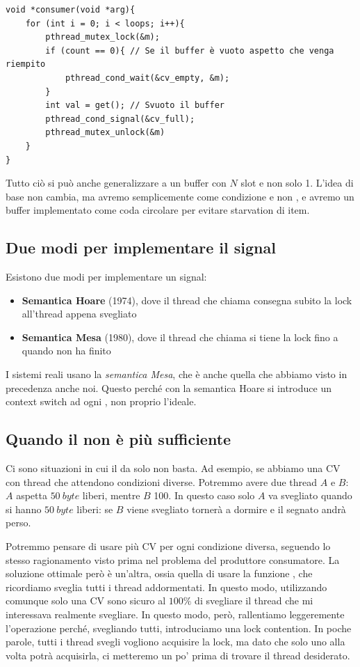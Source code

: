 \documentclass[11pt, a4paper, titlepage, oneside]{scrbook}
\begin{document}
\begin{lstlisting}[style=C]
void *consumer(void *arg){
    for (int i = 0; i < loops; i++){
        pthread_mutex_lock(&m);
        if (count == 0){ // Se il buffer è vuoto aspetto che venga riempito
            pthread_cond_wait(&cv_empty, &m);
        }
        int val = get(); // Svuoto il buffer
        pthread_cond_signal(&cv_full);
        pthread_mutex_unlock(&m)
    }
}
\end{lstlisting}

Tutto ciò si può anche generalizzare a un buffer con $N$ slot e non solo 1. L'idea di base non cambia, ma avremo semplicemente come condizione  e non , e avremo un buffer implementato come coda circolare per evitare starvation di item.

\subsection{Due modi per implementare il signal}

Esistono due modi per implementare un signal:
\begin{itemize}
    \item \textbf{Semantica Hoare} (1974), dove il thread che chiama  consegna subito la lock all'thread appena svegliato
    \item \textbf{Semantica Mesa} (1980), dove il thread che chiama  si tiene la lock fino a quando non ha finito
\end{itemize}

I sistemi reali usano la \textit{semantica Mesa}, che è anche quella che abbiamo visto in precedenza anche noi. Questo perché con la semantica Hoare si introduce un context switch ad ogni , non proprio l'ideale. 

\subsection{Quando il  non è più sufficiente}

Ci sono situazioni in cui il  da solo non basta. Ad esempio, se abbiamo una CV con thread che attendono condizioni diverse. Potremmo avere due thread $A$ e $B$: $A$ aspetta $\SI{50}{byte}$ liberi, mentre $B$ 100. In questo caso solo $A$ va svegliato quando si hanno $\SI{50}{byte}$ liberi: se $B$ viene svegliato tornerà a dormire e il segnato andrà perso.

Potremmo pensare di usare più CV per ogni condizione diversa, seguendo lo stesso ragionamento visto prima nel problema del produttore consumatore. La soluzione ottimale però è un'altra, ossia quella di usare la funzione , che ricordiamo sveglia tutti i thread addormentati. In questo modo, utilizzando comunque solo una CV sono sicuro al $100\%$ di svegliare il thread che mi interessava realmente svegliare. In questo modo, però, rallentiamo leggeremente l'operazione perché, svegliando tutti, introduciamo una lock contention. In poche parole, tutti i thread svegli vogliono acquisire la lock, ma dato che solo uno alla volta potrà acquisirla, ci metteremo un po' prima di trovare il thread desiderato.
\end{document}
